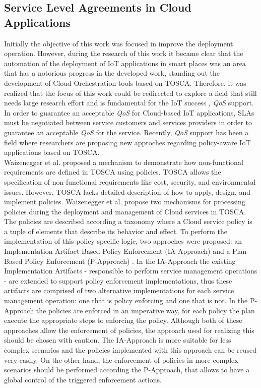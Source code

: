 \subsection{Service Level Agreements in Cloud Applications}
\label{sub:subsection label}
Initially the objective of this work was focused in improve the deployment operation. However, during
the research of this work it became clear that the automation of the deployment of IoT applications
in smart places was an area that has a notorious progress in the developed work, standing out the development
of Cloud Orchestration tools based on TOSCA. Therefore, it was realized that the focus of
this work could be redirected to explore a field that still needs large research effort and is fundamental
for the IoT success \cite{atzori2010internet}, \textit{QoS} support. In order to guarantee an acceptable \textit{QoS}
for Cloud-based IoT applications, SLAs must be negotiated between service customers and services
providers in order to guarantee an acceptable \textit{QoS} for the service. Recently, \textit{QoS} support has
been a field where researchers are proposing new approches regarding policy-aware IoT applications based on TOSCA.\\

Waizenegger et al. \cite{waizenegger2013policy4tosca} proposed a mechanism to demonstrate how non-functional
requirements are defined in TOSCA using policies. TOSCA allows the specification of non-functional requirements
like cost, security, and environmental issues. However, TOSCA lacks detailed description of how to apply, design,
and implement policies. Waizenegger et al. propose two mechanisms for processing policies during the deployment and
management of Cloud services in TOSCA. The policies are described according a taxonomy where a Cloud service
policy is a tuple of elements that describe its behavior and effect. To perform the implementation of this
policy-specific logic, two approches were proposed: an Implementation Artifact Based Policy Enforcement (IA-Approach)
and a Plan-Based Policy Enforcement (P-Approach) \cite{waizenegger2013policy4tosca}. In the IA-Approach the existing
Implementation Artifacts - responsible to perform service management operations - are extended to support
policy enforcement implementations, thus these artifacts are comprised of two alternative implementations
for each service management operation: one that is policy enforcing and one that is not. In the P-Approach the
policies are enforced in an imperative way, for each policy the plan execute the appropriate steps to enforcing
the policy. Although both of these approaches allow the enforcement of policies, the approach used for realizing
this should be chosen with caution. The IA-Approach is more suitable for less complex scenarios and the
policies implemented with this approach can be reused very easily. On the other hand, the enforcement of
policies in more complex scenarios should be performed according the P-Approach, that allows to have a global
control of the triggered enforcement actions.\\

